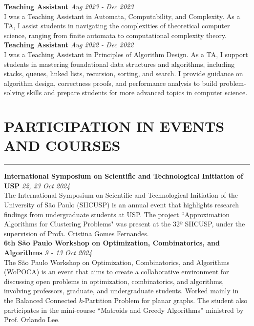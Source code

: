 \documentclass[a4paper,10pt]{article}
\begin{document}
\noindent\textbf{Teaching Assistant}  \hfill  \textit{Aug 2023 - Dec 2023}\\
I was a Teaching Assistant in Automata, Computability, and Complexity. As a TA, I assist students in navigating the complexities of theoretical computer science, ranging from finite automata to computational complexity theory. \\

\noindent\textbf{Teaching Assistant} \hfill  \textit{Aug 2022 - Dec 2022}\\
I was a Teaching Assistant in Principles of Algorithm Design. As a TA, I support students in mastering foundational data structures and algorithms, including stacks, queues, linked lists, recursion, sorting, and search. I provide guidance on algorithm design, correctness proofs, and performance analysis to build problem-solving skills and prepare students for more advanced topics in computer science.\\

\vspace{0.2cm}
\section*{PARTICIPATION IN EVENTS AND COURSES}
\vspace{-1.5em} %
\noindent\rule{\textwidth}{0.4pt} %

\noindent\textbf{International Symposium on Scientific and Technological Initiation of USP} \hfill \textit{22, 23 Oct 2024}\\
The International Symposium on Scientific and Technological Initiation of the University of São Paulo (SIICUSP) is an annual event that highlights research findings from undergraduate students at USP. The project ``Approximation Algorithms for Clustering Problems" was present at the 32º SIICUSP, under the supervision of Profa. Cristina Gomes Fernandes. \\

\noindent\textbf{6th São Paulo Workshop on Optimization, Combinatorics, and Algorithms} \hfill \textit{9 - 13 Oct 2024}\\
The São Paulo Workshop on Optimization, Combinatorics, and Algorithms (WoPOCA) is an event that aims to create a collaborative environment for discussing open problems in optimization, combinatorics, and algorithms, involving professors, graduate, and undergraduate students. Worked mainly in the Balanced Connected \(k\)-Partition Problem for planar graphs. The student also participates in the mini-course ``Matroids and Greedy Algorithms'' ministred by Prof. Orlando Lee. \\
\end{document}
